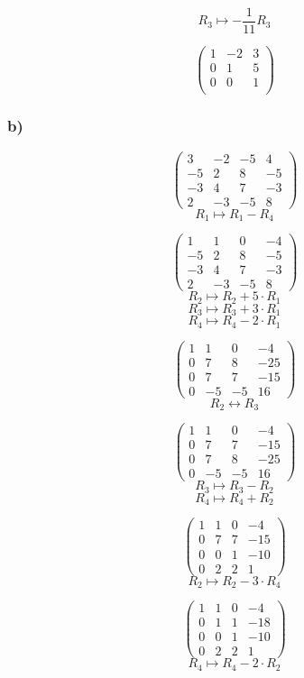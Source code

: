 \documentclass[lineaire_algebra_oplossingen.tex]{subfiles}
\begin{document}
$$R_3 \longmapsto -\frac{1}{11} R_3$$

$$\begin{pmatrix}
1 & -2 & 3\\
0 & 1 & 5\\
0 & 0 & 1\\
\end{pmatrix}
$$
\subsubsection*{b)}
$$
\begin{pmatrix}
3 & -2 & -5 & 4\\
-5 & 2 & 8 & -5\\
-3 & 4 & 7 & -3\\
2 & -3 & -5 & 8
\end{pmatrix}
$$
$$R_1 \longmapsto R_1 - R_4$$

$$
\begin{pmatrix}
1 & 1 & 0 & -4\\
-5 & 2 & 8 & -5\\
-3 & 4 & 7 & -3\\
2 & -3 & -5 & 8
\end{pmatrix}
$$
$$R_2 \longmapsto R_2 + 5\cdot R_1$$
$$R_3 \longmapsto R_3 + 3\cdot R_1$$
$$R_4 \longmapsto R_4 - 2\cdot R_1$$

$$
\begin{pmatrix}
1 & 1 & 0 & -4\\
0 & 7 & 8 & -25\\
0 & 7 & 7 & -15\\
0 & -5 & -5 & 16
\end{pmatrix}
$$
$$R_2 \leftrightarrow R_3$$

$$
\begin{pmatrix}
1 & 1 & 0 & -4\\
0 & 7 & 7 & -15\\
0 & 7 & 8 & -25\\
0 & -5 & -5 & 16
\end{pmatrix}
$$
$$R_3 \longmapsto R_3 - R_2$$
$$R_4 \longmapsto R_4 + R_2$$

$$
\begin{pmatrix}
1 & 1 & 0 & -4\\
0 & 7 & 7 & -15\\
0 & 0 & 1 & -10\\
0 & 2 & 2 & 1
\end{pmatrix}
$$
$$R_2 \longmapsto R_2 - 3\cdot R_4$$

$$
\begin{pmatrix}
1 & 1 & 0 & -4\\
0 & 1 & 1 & -18\\
0 & 0 & 1 & -10\\
0 & 2 & 2 & 1
\end{pmatrix}
$$
$$R_4 \longmapsto R_4 - 2\cdot R_2$$
\end{document}

